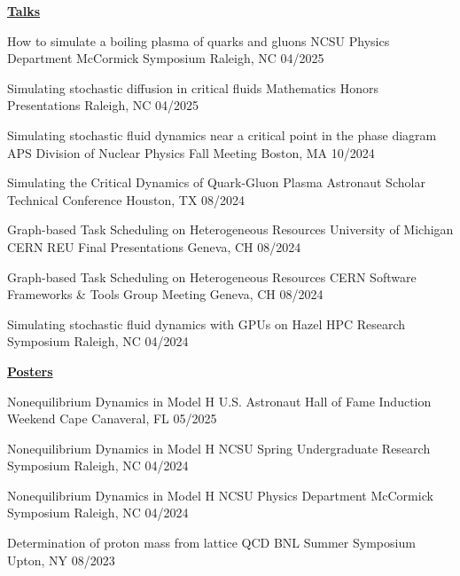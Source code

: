 {\large \bfseries \underline{Talks}}
\vspace{0.3em}

\presentation
{How to simulate a boiling plasma of quarks and gluons}
{NCSU Physics Department McCormick Symposium}
{Raleigh, NC} {04/2025}

\presentation
{Simulating stochastic diffusion in critical fluids}
{Mathematics Honors Presentations}
{Raleigh, NC} {04/2025}

\presentation
{Simulating stochastic fluid dynamics near a critical point in the phase diagram}
{APS Division of Nuclear Physics Fall Meeting}
{Boston, MA} {10/2024}

\presentation
{Simulating the Critical Dynamics of Quark-Gluon Plasma}
{Astronaut Scholar Technical Conference}
{Houston, TX} {08/2024}

\presentation
{Graph-based Task Scheduling on Heterogeneous Resources}
{University of Michigan CERN REU Final Presentations}
{Geneva, CH} {08/2024}

\presentation
{Graph-based Task Scheduling on Heterogeneous Resources}
{CERN Software Frameworks \& Tools Group Meeting}
{Geneva, CH} {08/2024}

\presentation
{Simulating stochastic fluid dynamics with GPUs on Hazel}
{HPC Research Symposium}
{Raleigh, NC} {04/2024}

{\large \bfseries \underline{Posters}}
\vspace{0.3em}

\presentation
{Nonequilibrium Dynamics in Model H}
{U.S. Astronaut Hall of Fame Induction Weekend}
{Cape Canaveral, FL} {05/2025}

\presentation
{Nonequilibrium Dynamics in Model H}
{NCSU Spring Undergraduate Research Symposium}
{Raleigh, NC} {04/2024}

\presentation
{Nonequilibrium Dynamics in Model H}
{NCSU Physics Department McCormick Symposium}
{Raleigh, NC} {04/2024}

\presentation
{Determination of proton mass from lattice QCD}
{BNL Summer Symposium}
{Upton, NY} {08/2023}
